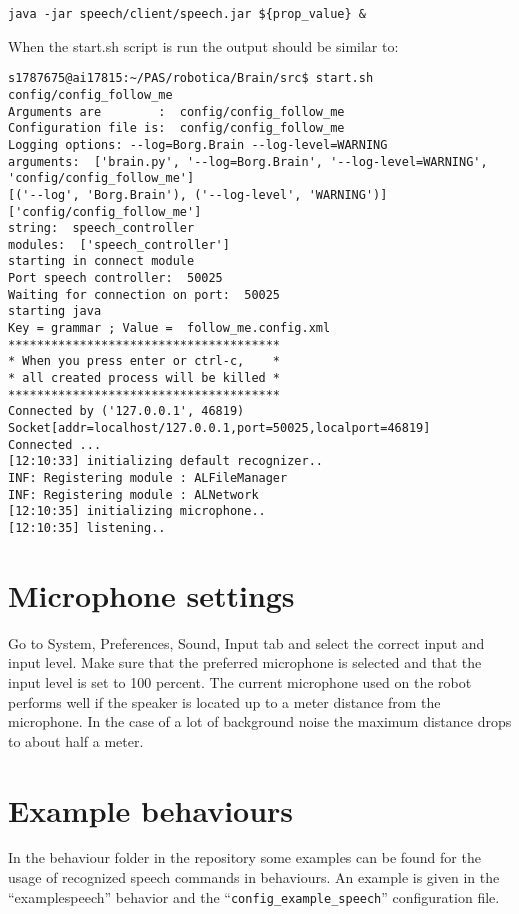 \documentclass[a4paper, 10pt]{article}
\begin{document}
\begin{verbatim}
java -jar speech/client/speech.jar ${prop_value} &
\end{verbatim}

When the start.sh script is run the output should be similar to:

\begin{verbatim}
s1787675@ai17815:~/PAS/robotica/Brain/src$ start.sh config/config_follow_me
Arguments are        :  config/config_follow_me
Configuration file is:  config/config_follow_me
Logging options: --log=Borg.Brain --log-level=WARNING 
arguments:  ['brain.py', '--log=Borg.Brain', '--log-level=WARNING', 'config/config_follow_me']
[('--log', 'Borg.Brain'), ('--log-level', 'WARNING')] ['config/config_follow_me']
string:  speech_controller
modules:  ['speech_controller']
starting in connect module
Port speech controller:  50025
Waiting for connection on port:  50025
starting java
Key = grammar ; Value =  follow_me.config.xml
**************************************
* When you press enter or ctrl-c,    *
* all created process will be killed *
**************************************
Connected by ('127.0.0.1', 46819)
Socket[addr=localhost/127.0.0.1,port=50025,localport=46819]
Connected ...
[12:10:33] initializing default recognizer..
INF: Registering module : ALFileManager
INF: Registering module : ALNetwork
[12:10:35] initializing microphone..
[12:10:35] listening..
\end{verbatim}

\section{Microphone settings}

Go to System, Preferences, Sound, Input tab and select the correct input and input level. Make sure that the preferred microphone is selected and that the input level is set to 100 percent. The current microphone used on the robot performs well if the speaker is located up to a meter distance from the microphone. In the case of a lot of background noise the maximum distance drops to about half a meter.

\section{Example behaviours}

In the behaviour folder in the repository some examples can be found for the usage of recognized speech commands in behaviours. 
An example is given in the ``examplespeech'' behavior and the ``\lstinline{config_example_speech}'' configuration file.
\end{document}

